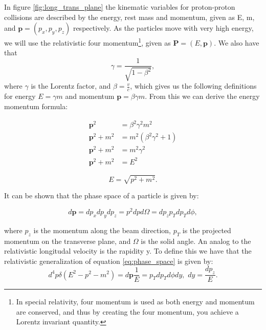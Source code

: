 In figure \ref{fig:long_trans_plane} the kinematic variables for proton-proton collisions are described by the energy, rest mass 
and momentum, given as E, m, and $\textbf{p} = (p_x, p_y, p_z)$ respectively. As the particles move with very high energy, we will 
use the relativistic four momentum\footnote{In special relativity, four momentum is used as both energy and momentum are conserved, and 
thus by creating the four momentum, you achieve a Lorentz invariant quantity\cite{Thomson:2013zua}. }, given as $\textbf{P} = (E, \textbf{p})$. We also have that 
\begin{equation*}
    \gamma = \frac{1}{\sqrt{1-\beta^2}},
\end{equation*}
where $\gamma$ is the Lorentz factor, and $\beta = \frac{v}{c}$, which gives us the following definitions for energy $E = \gamma m$ and momentum $\textbf{p} = \beta\gamma m$\cite{Gramstad:1631043}. 
From this we can derive the energy momentum formula:

\begin{align*} 
    \textbf{p}^2 &= \beta^2\gamma^2m^2  \\ 
    \textbf{p}^2 + m^2 &=  m^2(\beta^2\gamma^2 + 1) \\
    \textbf{p}^2 + m^2 &= m^2\gamma^2 \\
    \textbf{p}^2 + m^2 &= E^2
\end{align*}

\begin{equation}\label{eq:energy_momentum}
    E = \sqrt{p^2 + m^2}.
\end{equation}

It can be shown that the phase space of a particle is given by\cite{green_highpt}:

\begin{equation}\label{eq:phase_space}
    d\textbf{p} = dp_xdp_ydp_z = p^2dpd\Omega = dp_zp_Tdp_Td\phi,
\end{equation}

where $p_z$ is the momentum along the beam direction, $p_T$ is the projected momentum on the transverse plane, 
and $\Omega$ is the solid angle. An analog to the relativistic longitudal velocity is the rapidity y. To define this 
we have that the relativistic generalization of equation \ref{eq:phase_space} is given by:
\begin{equation*}
    d^4p\delta (E^2 - p^2 - m^2) = d\textbf{p}\frac{1}{E} = p_T dp_Td\phi dy, \, \, dy = \frac{dp_z}{E}.
\end{equation*}

